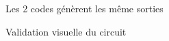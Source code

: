 \begin{frame} 
	\begin{center}
	\end{center}
	\hspace{2cm} Les 2 codes génèrent les même sorties
\end{frame}

\begin{frame} 
	\begin{center}
	\end{center}
	\hspace{2cm} Validation visuelle du circuit
\end{frame}
